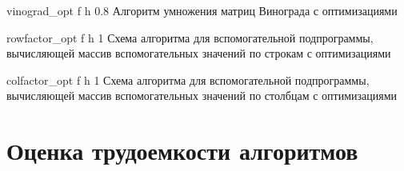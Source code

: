 {vinograd_opt} %
{f} %
{h} %
{0.8\textwidth} %
{Алгоритм умножения матриц Винограда с оптимизациями} %

{rowfactor_opt} %
{f} %
{h} %
{1\textwidth} %
{Схема алгоритма для вспомогательной подпрограммы, вычисляющей массив вспомогательных значений по строкам с оптимизациями} %

{colfactor_opt} %
{f} %
{h} %
{1\textwidth} %
{Схема алгоритма для вспомогательной подпрограммы, вычисляющей массив вспомогательных значений по столбцам с оптимизациями} %

\clearpage

\section{Оценка трудоемкости алгоритмов}

